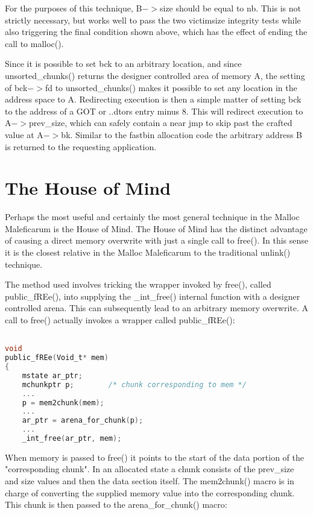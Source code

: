 \documentclass[12pt]{article}
\begin{document}
For the purposes of this technique, B$->$size should be equal to nb.
This is not strictly necessary, but works well to pass the two
victimsize integrity tests while also triggering the final
condition shown above, which has the effect of ending the call to
malloc().
\newline


Since it is possible to set bck to an arbitrary location, and since
unsorted\_chunks() returns the designer controlled area of memory A,
the setting of bck$->$fd to unsorted\_chunks() makes it possible to
set any location in the address space to A. Redirecting execution
is then a simple matter of setting bck to the address of a GOT or
..dtors entry minus 8. This will redirect execution to A$->$prev\_size,
which can safely contain a near jmp to skip past the crafted value
at A$->$bk. Similar to the fastbin allocation code the arbitrary
address B is returned to the requesting application.

\section{The House of Mind}

Perhaps the most useful and certainly the most general technique in
the Malloc Maleficarum is the House of Mind. The House of Mind has
the distinct advantage of causing a direct memory overwrite with
just a single call to free(). In this sense it is the closest
relative in the Malloc Maleficarum to the traditional unlink()
technique.
\newline


The method used involves tricking the wrapper invoked by free(),
called public\_fREe(), into supplying the \_int\_free() internal
function with a designer controlled arena. This can subsequently
lead to an arbitrary memory overwrite. A call to free() actually
invokes a wrapper called public\_fREe():
\begin{lstlisting}[language=C]

void
public_fREe(Void_t* mem)
{
    mstate ar_ptr;
    mchunkptr p;        /* chunk corresponding to mem */
    ...
    p = mem2chunk(mem);
    ...
    ar_ptr = arena_for_chunk(p);
    ...
    _int_free(ar_ptr, mem);
\end{lstlisting}
When memory is passed to free() it points to the start of the data
portion of the "corresponding chunk". In an allocated state a chunk
consists of the prev\_size and size values and then the data section
itself. The mem2chunk() macro is in charge of converting the
supplied memory value into the corresponding chunk. This chunk is
then passed to the arena\_for\_chunk() macro:
\end{document}
